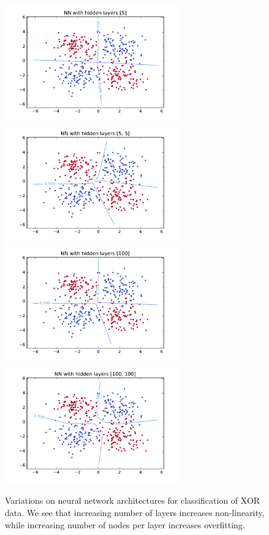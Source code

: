\documentclass{article}
\begin{document}
\begin{multicols}{2}
\begin{figure}
   \centering
   \includegraphics[width=3in]{img/p1/4-1small-382of400-16500.pdf}\hspace{-.25in}
   \includegraphics[width=3in]{img/p1/4-2small-380of400-3550.pdf}
   \includegraphics[width=3in]{img/p1/4-1large-380of400.pdf}\hspace{-.25in}
   \includegraphics[width=3in]{img/p1/4-2large-379of400-123000.pdf}
   \caption{Variations on neural network architectures for classification of
   XOR data. We see that increasing number of layers increases non-linearity,
   while increasing number of nodes per layer increases overfitting. 
   }
   \label{fig:1-2-arch}
\end{figure}


\end{multicols}
\end{document}
